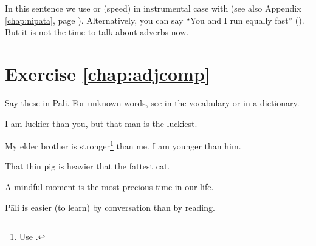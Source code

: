 
In this sentence we use  or  (speed) in instrumental case with  (see also Appendix \ref{chap:nipata}, page \pageref{nip:samadm}). Alternatively, you can say ``You and I run equally fast'' (). But it is not the time to talk about adverbs now.

\section*{Exercise \ref{chap:adjcomp}}
Say these in P\=ali. For unknown words, see in the vocabulary or in a dictionary.
\begin{compactenum}
\item I am luckier than you, but that man is the luckiest.
\item My elder brother is stronger\footnote{Use .} than me. I am younger than him.
\item That thin pig is heavier that the fattest cat.
\item A mindful moment is the most precious time in our life.
\item P\=ali is easier (to learn) by conversation than by reading.
\end{compactenum}
